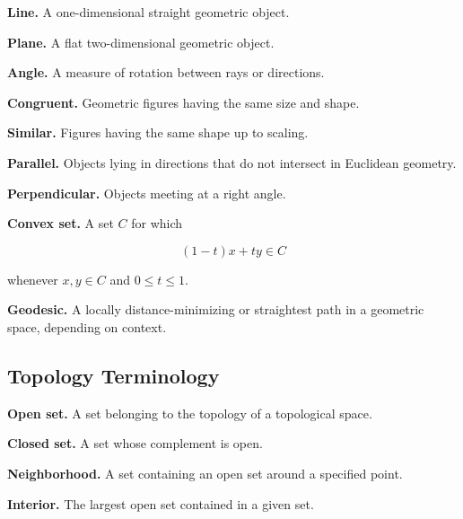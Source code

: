 \medskip

\textbf{Line.}
A one-dimensional straight geometric object.

\medskip

\textbf{Plane.}
A flat two-dimensional geometric object.

\medskip

\textbf{Angle.}
A measure of rotation between rays or directions.

\medskip

\textbf{Congruent.}
Geometric figures having the same size and shape.

\medskip

\textbf{Similar.}
Figures having the same shape up to scaling.

\medskip

\textbf{Parallel.}
Objects lying in directions that do not intersect in Euclidean geometry.

\medskip

\textbf{Perpendicular.}
Objects meeting at a right angle.

\medskip

\textbf{Convex set.}
A set \(C\) for which

\[
\boxed{
(1-t)x+ty\in C
}
\]

whenever \(x,y\in C\) and \(0\leq t\leq1\).

\medskip

\textbf{Geodesic.}
A locally distance-minimizing or straightest path in a geometric space,
depending on context.

\subsection{Topology Terminology}
\label{subsec:topology-terminology-reference}

\textbf{Open set.}
A set belonging to the topology of a topological space.

\medskip

\textbf{Closed set.}
A set whose complement is open.

\medskip

\textbf{Neighborhood.}
A set containing an open set around a specified point.

\medskip

\textbf{Interior.}
The largest open set contained in a given set.

\medskip


